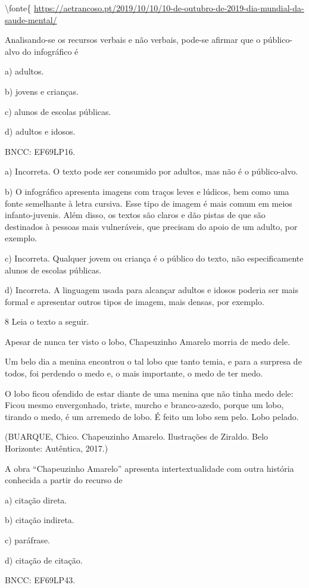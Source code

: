 \textbackslash fonte\{
\url{https://aetrancoso.pt/2019/10/10/10-de-outubro-de-2019-dia-mundial-da-saude-mental/}

Analisando-se os recursos verbais e não verbais, pode-se afirmar que o
público-alvo do infográfico é

a) adultos.

b) jovens e crianças.

c) alunos de escolas públicas.

d) adultos e idosos.

BNCC: EF69LP16.

a) Incorreta. O texto pode ser consumido por adultos, mas não é o
público-alvo.

b) O infográfico apresenta imagens com traços leves e lúdicos, bem como
uma fonte semelhante à letra cursiva. Esse tipo de imagem é mais comum
em meios infanto-juvenis. Além disso, os textos são claros e dão pistas
de que são destinados à pessoas mais vulneráveis, que precisam do apoio
de um adulto, por exemplo.

c) Incorreta. Qualquer jovem ou criança é o público do texto, não
especificamente alunos de escolas públicas.

d) Incorreta. A linguagem usada para alcançar adultos e idosos poderia
ser mais formal e apresentar outros tipos de imagem, mais densas, por
exemplo.

\num{8} Leia o texto a seguir.

Apesar de nunca ter visto o lobo, Chapeuzinho Amarelo morria de medo
dele.

Um belo dia a menina encontrou o tal lobo que tanto temia, e para a
surpresa de todos, foi perdendo o medo e, o mais importante, o medo de
ter medo.

O lobo ficou ofendido de estar diante de uma menina que não tinha medo
dele: Ficou mesmo envergonhado, triste, murcho e branco-azedo, porque um
lobo, tirando o medo, é um arremedo de lobo. É feito um lobo sem pelo.
Lobo pelado.

(BUARQUE, Chico. Chapeuzinho Amarelo. Ilustrações de Ziraldo. Belo
Horizonte: Autêntica, 2017.)

A obra ``Chapeuzinho Amarelo'' apresenta intertextualidade com outra
história conhecida a partir do recurso de

a) citação direta.

b) citação indireta.

c) paráfrase.

d) citação de citação.

BNCC: EF69LP43.

